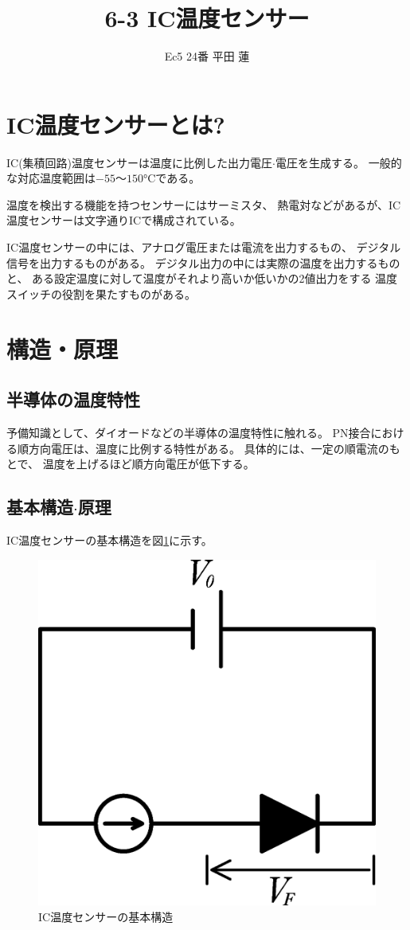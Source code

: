 \documentclass[twocolumn]{jsarticle}
\title{6-3 IC温度センサー}
\author{Ec5 24番 平田 蓮}
\date{}
\begin{document}
\maketitle
\section{IC温度センサーとは?}
    IC(集積回路)温度センサーは温度に比例した出力電圧$\cdot$電圧を生成する。
    一般的な対応温度範囲は$-55〜150 \si{\degreeCelsius}$である。

    温度を検出する機能を持つセンサーにはサーミスタ、
    熱電対などがあるが、IC温度センサーは文字通りICで構成されている。

    IC温度センサーの中には、アナログ電圧または電流を出力するもの、
    デジタル信号を出力するものがある。
    デジタル出力の中には実際の温度を出力するものと、
    ある設定温度に対して温度がそれより高いか低いかの2値出力をする
    温度スイッチの役割を果たすものがある。

\section{構造・原理}
    \subsection{半導体の温度特性}
        予備知識として、ダイオードなどの半導体の温度特性に触れる。
        PN接合における順方向電圧は、温度に比例する特性がある。
        具体的には、一定の順電流のもとで、
        温度を上げるほど順方向電圧が低下する。

    \subsection{基本構造$\cdot$原理}
        IC温度センサーの基本構造を図\ref{fig:analog}に示す。

        \begin{figure}[h]
            \centering
            \includegraphics[width=0.6\hsize]{img/analog.eps}
            \caption{IC温度センサーの基本構造}
            \label{fig:analog}
        \end{figure}
\end{document}
